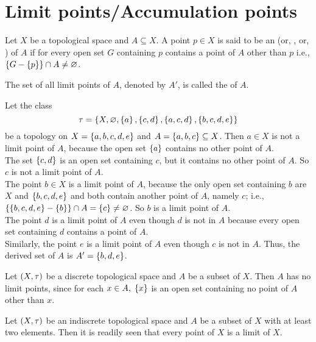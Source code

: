 \documentclass[../main-sheet.tex]{subfiles}
\begin{document}
\section{Limit points/Accumulation points}
\begin{defn}
    Let  \(X\) be a topological space and  \(A\subseteq X\). A point  \(p\in X\) is said to be an  (or, , or, ) of  \(A\) if for every open set  \(G\) containing  \(p\) contains a point of  \(A\) other than  \(p\) i.e.,  \(\left\{G-\left\{p\right\}\right\}\cap A\neq \varnothing\).

    The set of all limit points of  \(A\), denoted by  \(A'\), is called the  of  \(A\).
\end{defn}
\begin{ex}
    Let the class 
    \[\tau=\left\{X,\varnothing,\left\{a\right\},\left\{c,d\right\},\left\{a,c,d\right\},\left\{b,c,d,e\right\}\right\}\]
    be a topology on  \(X=\left\{a,b,c,d,e\right\}\) and  \(A=\left\{a,b,c\right\}\subseteq X\). Then  \(a\in X\) is not a limit point of  \(A\), because the open set  \(\left\{a\right\}\) contains no other point of  \(A\).\\
    The set  \(\left\{c,d\right\}\) is an open set containing  \(c\), but it contains no other point of  \(A\). So  \(c\) is not a limit point of  \(A\).\\
    The point  \(b\in X\) is a limit point of  \(A\), because the only open set containing  \(b\) are  \(X\) and  \(\left\{b,c,d,e\right\}\) and both contain another point of  \(A\), namely  \(c\); i.e.,  \(\left\{\left\{b,c,d,e\right\}-\left\{b\right\}\right\}\cap A=\left\{c\right\}\neq \varnothing\). So  \(b\) is a limit point of  \(A\).\\
    The point  \(d\) is a limit point of  \(A\) even though  \(d\) is not in  \(A\) because every open set containing  \(d\) contains a point of  \(A\).\\
    Similarly, the point  \(e\) is a limit point of  \(A\) even though  \(c\) is not in  \(A\). Thus, the derived set of  \(A\) is  \(A'=\left\{b,d,e\right\}\).
\end{ex}
\begin{ex}
    Let  \((X, \tau)\) be a discrete topological space and  \(A\) be a subset of  \(X\). Then  \(A\) has no limit points, since for each  \(x\in A,\;\left\{x\right\} \) is an open set containing no point of  \(A\) other than  \(x\).
\end{ex}
\begin{ex}
    Let  \((X, \tau)\) be an indiscrete topological space and  \(A\) be a subset of  \(X\) with at least two elements. Then it is readily seen that every point of  \(X\) is a limit of  \(X\).
\end{ex}
\end{document}
